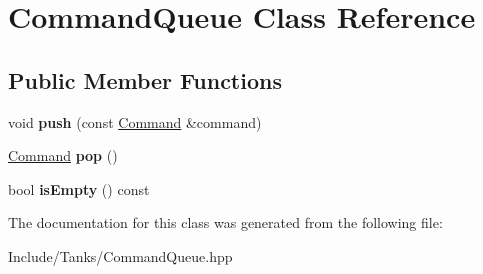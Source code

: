 \hypertarget{class_command_queue}{}\section{Command\+Queue Class Reference}
\label{class_command_queue}
\subsection*{Public Member Functions}
\begin{DoxyCompactItemize}
\item 
\hypertarget{class_command_queue_ad444e0d7af45d9e09b834f0cec1e1f43}{}void {\bfseries push} (const \hyperlink{struct_command}{Command} \&command)\label{class_command_queue_ad444e0d7af45d9e09b834f0cec1e1f43}

\item 
\hypertarget{class_command_queue_ac2dde510222b8df393b55978f4594194}{}\hyperlink{struct_command}{Command} {\bfseries pop} ()\label{class_command_queue_ac2dde510222b8df393b55978f4594194}

\item 
\hypertarget{class_command_queue_ad4f4731c185a293724a59aba9a5903d6}{}bool {\bfseries is\+Empty} () const \label{class_command_queue_ad4f4731c185a293724a59aba9a5903d6}

\end{DoxyCompactItemize}


The documentation for this class was generated from the following file\+:\begin{DoxyCompactItemize}
\item 
Include/\+Tanks/Command\+Queue.\+hpp\end{DoxyCompactItemize}

